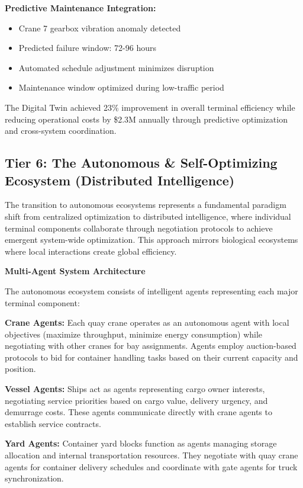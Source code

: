 \documentclass{article}
\begin{document}
\textbf{Predictive Maintenance Integration:}
\begin{itemize}
\item Crane 7 gearbox vibration anomaly detected
\item Predicted failure window: 72-96 hours
\item Automated schedule adjustment minimizes disruption
\item Maintenance window optimized during low-traffic period
\end{itemize}

The Digital Twin achieved 23\% improvement in overall terminal efficiency while reducing operational costs by \$2.3M annually through predictive optimization and cross-system coordination.

\subsection{Tier 6: The Autonomous \& Self-Optimizing Ecosystem (Distributed Intelligence)}

The transition to autonomous ecosystems represents a fundamental paradigm shift from centralized optimization to distributed intelligence, where individual terminal components collaborate through negotiation protocols to achieve emergent system-wide optimization. This approach mirrors biological ecosystems where local interactions create global efficiency.

\textbf{Multi-Agent System Architecture}

The autonomous ecosystem consists of intelligent agents representing each major terminal component:

\textbf{Crane Agents:} Each quay crane operates as an autonomous agent with local objectives (maximize throughput, minimize energy consumption) while negotiating with other cranes for bay assignments. Agents employ auction-based protocols to bid for container handling tasks based on their current capacity and position.

\textbf{Vessel Agents:} Ships act as agents representing cargo owner interests, negotiating service priorities based on cargo value, delivery urgency, and demurrage costs. These agents communicate directly with crane agents to establish service contracts.

\textbf{Yard Agents:} Container yard blocks function as agents managing storage allocation and internal transportation resources. They negotiate with quay crane agents for container delivery schedules and coordinate with gate agents for truck synchronization.
\end{document}

